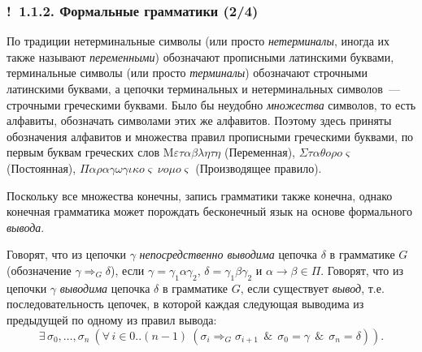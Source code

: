 \documentclass[mathserif,12pt,aspectratio=169]{beamer}
\def\emразделенной{\em разделенной}
\renewcommand{\index}[1]{}
\def\em#1{\it\color{blue}#1}
\def\odmkey#1#2{{\it\color{red} #1}\index{#2}}
\def\A#1#2{\forall\,#1\ \left(#2\right)}
\def\E#1#2{\exists\,#1\ \left(#2\right)}
\def\Tuple#1#2#3{{#1}_{#2},\dots,{#1}_{#3}}
\def\And{\operatorname{\,\&\,}}
\def\Ok{{\color{green}\textbf{!}\ }}
\begin{document}
\begin{frame}
\frametitle{\Ok 1.1.2. Формальные грамматики (2/4)}

\begin{remark}
По традиции нетерминальные символы (или просто
\odmkey{нетерминалы}{Нетерминал}, 
иногда их также называют \odmkey{переменными}{Переменная}) обозначают прописными латинскими
буквами, терминальные символы (или просто
\odmkey{терминалы}{Терминал}) обозначают строчными латинскими
буквами, а цепочки терминальных и нетерминальных символов~---
строчными греческими буквами.
Было бы неудобно {\em множества} символов, то есть алфавиты, 
обозначать символами этих же алфавитов.
Поэтому здесь приняты обозначения алфавитов и множества правил прописными
греческими буквами, по первым буквам греческих слов
$\mathrm{M}\varepsilon\tau\alpha\beta\lambda\eta\tau\eta$ (Переменная),
$\Sigma\tau\alpha\theta o\rho o\varsigma$ (Постоянная),
$\Pi\alpha\rho\alpha\gamma\omega\gamma\iota\kappa o\varsigma
\ \nu o\mu o\varsigma$ (Производящее правило).
\end{remark}

\medskip
Поскольку все множества конечны, 
запись грамматики также конечна,
однако конечная грамматика может порождать
бесконечный язык на основе 
формального \odmkey{вывода}{Вывод}.

\medskip   
Говорят, что из цепочки $\gamma$ \odmkey{непосредственно
выводима}{Выводимость!непосредственная} цепочка $\delta$ в
грамматике $G$ (обозначение $\gamma\Rightarrow_G \delta$), если
$\gamma=\gamma_1\alpha\gamma_2$, $\delta=\gamma_1\beta\gamma_2$ и
$\alpha\rightarrow\beta\in \Pi$. Говорят, что из цепочки $\gamma$
\odmkey{выводима}{Выводимость} цепочка $\delta$ в грамматике $G$,
если существует \odmkey{вывод}{Вывод}, т.е. последовательность цепочек, в которой каждая следующая выводима из предыдущей по одному из правил вывода: 
$$\E{\Tuple{\sigma}{0}{n}}
{\A{i\in 0..(n-1)}{\sigma_{i}\Rightarrow_G\sigma_{i+1} \And \sigma_0 = \gamma
\And \sigma_n = \delta}}.$$ 
\end{frame}
\end{document}
